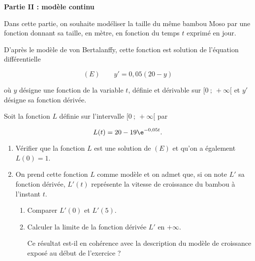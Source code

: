 \bigskip

\textbf{Partie II : modèle continu}

\medskip

Dans cette partie, on souhaite modéliser la taille du même bambou Moso par une fonction donnant sa taille, en mètre, en fonction du temps $t$ exprimé en jour. 

D'après le modèle de von Bertalanffy, cette fonction est solution de l'équation différentielle

\[(E) \qquad y' = 0,05(20 - y)\]

où $y$ désigne une fonction de la variable $t$, définie et dérivable sur $[0~;~+\infty[$ et $y'$ désigne sa fonction dérivée.

Soit la fonction $L$ définie sur l'intervalle $[0~;~+\infty[$ par 

\[L(t) = 20 - 19\e^{-0,05t}.\]

\smallskip

\begin{enumerate}
\item Vérifier que la fonction $L$ est une solution de $(E)$ et qu'on a également $L(0) = 1$.
\item On prend cette fonction $L$ comme modèle et on admet que, si on note $L'$ sa fonction dérivée,
$L'(t)$ représente la vitesse de croissance du bambou à l'instant $t$.
	\begin{enumerate}
		\item Comparer $L'(0)$ et $L'(5)$.
		\item Calculer la limite de la fonction dérivée $L'$ en $+\infty$. 
		
Ce résultat est-il en cohérence avec la description du modèle de croissance exposé au début de l'exercice ?
	\end{enumerate}
\end{enumerate}

\bigskip


